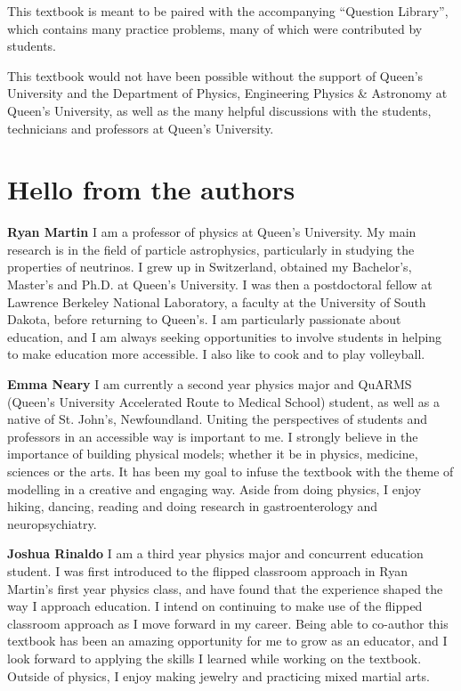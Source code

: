 This textbook is meant to be paired with the accompanying ``Question Library'', which contains many practice problems, many of which were contributed by students.

This textbook would not have been possible without the support of Queen's University and the Department of Physics, Engineering Physics \& Astronomy at Queen's University, as well as the many helpful discussions with the students, technicians and professors at Queen's University.

\section*{Hello from the authors}
\textbf{Ryan Martin} I am a professor of physics at Queen's University. My main research is in the field of particle astrophysics, particularly in studying the properties of neutrinos. I grew up in Switzerland, obtained my Bachelor's, Master's and Ph.D. at Queen's University. I was then a postdoctoral fellow at Lawrence Berkeley National Laboratory, a faculty at the University of South Dakota, before returning to Queen's. I am particularly passionate about education, and I am always seeking opportunities to involve students in helping to make education more accessible. I also like to cook and to play volleyball.

\textbf{Emma Neary} I am currently a second year physics major and QuARMS (Queen's University Accelerated Route to Medical School) student, as well as a native of St. John's, Newfoundland. Uniting the perspectives of students and professors in an accessible way is important to me. I strongly believe in the importance of building physical models; whether it be in physics, medicine, sciences or the arts. It has been my goal to infuse the textbook with the theme of modelling in a creative and engaging way. Aside from doing physics, I enjoy hiking, dancing, reading and doing research in gastroenterology and neuropsychiatry.

\textbf{Joshua Rinaldo} I am a third year physics major and concurrent education student. I was first introduced to the flipped classroom approach in Ryan Martin's first year physics class, and have found that the experience shaped the way I approach education. I intend on continuing to make use of the flipped classroom approach as I move forward in my career. Being able to co-author this textbook has been an amazing opportunity for me to grow as an educator, and I look forward to applying the skills I learned while working on the textbook. Outside of physics, I enjoy making jewelry and practicing mixed martial arts.

